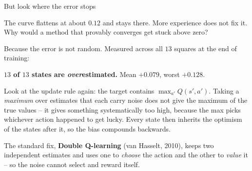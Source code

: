 \documentclass[aspectratio=169]{beamer}
\begin{document}
\begin{frame}{But look where the error stops}
  \begin{tcolorbox}[colback=armorange!12, colframe=armorange, boxrule=0.7pt, arc=2pt]
    The curve flattens at about $0.12$ and stays there. More experience does not fix it. Why
    would a method that provably converges get stuck above zero?
  \end{tcolorbox}

  \vskip 6pt
  \footnotesize
  Because the error is not random. Measured across all $13$ squares at the end of training:

  \vskip 3pt
  \begin{center}
    \textbf{$13$ of $13$ states are \emph{over}estimated.} Mean $+0.079$, worst $+0.128$.
  \end{center}

  \vskip 6pt
  \begin{tcolorbox}[colback=armblue!8, colframe=armblue, boxrule=0.6pt, arc=2pt,
                    title=\textbf{Maximisation bias}]
    \footnotesize
    Look at the update rule again: the target contains $\max_{a'} Q(s',a')$. Taking a
    \emph{maximum} over estimates that each carry noise does not give the maximum of the true
    values -- it gives something systematically too high, because the max picks whichever
    action happened to get lucky. Every state then inherits the optimism of the states after
    it, so the bias compounds backwards.
  \end{tcolorbox}

  \vskip 5pt
  \footnotesize
  The standard fix, \textbf{Double Q-learning} (van Hasselt, 2010), keeps two independent
  estimates and uses one to \emph{choose} the action and the other to \emph{value} it -- so the
  noise cannot select and reward itself.
\end{frame}
\end{document}
